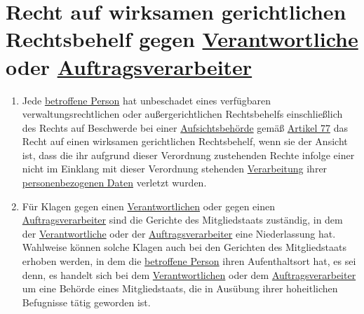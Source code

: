 \chapter{Recht auf wirksamen gerichtlichen Rechtsbehelf gegen \hyperref[itm:04-7]{Verantwortliche} oder \hyperref[itm:04-8]{Auftragsverarbeiter}}
\label{ch:79}


\begin{enumerate}

  \item Jede \hyperref[itm:04-1]{betroffene Person} hat unbeschadet eines verfügbaren verwaltungsrechtlichen oder außergerichtlichen
   Rechtsbehelfs einschließlich des Rechts auf Beschwerde bei einer \hyperref[itm:04-21]{Aufsichtsbehörde} gemäß \hyperref[ch:77]{Artikel 77}
   das Recht auf einen wirksamen gerichtlichen Rechtsbehelf, wenn sie der Ansicht ist, dass die ihr aufgrund dieser
   Verordnung zustehenden Rechte infolge einer nicht im Einklang mit dieser Verordnung stehenden \hyperref[itm:04-2]{Verarbeitung} ihrer
   \hyperref[itm:04-1]{personenbezogenen Daten} verletzt wurden.
  \label{itm:79-1}

  \item Für Klagen gegen einen \hyperref[itm:04-7]{Verantwortlichen} oder gegen einen \hyperref[itm:04-8]{Auftragsverarbeiter} sind die Gerichte des
   Mitgliedstaats zuständig, in dem der \hyperref[itm:04-7]{Verantwortliche} oder der \hyperref[itm:04-8]{Auftragsverarbeiter} eine Niederlassung hat. Wahlweise
   können solche Klagen auch bei den Gerichten des Mitgliedstaats erhoben werden, in dem die \hyperref[itm:04-1]{betroffene Person} ihren
   Aufenthaltsort hat, es sei denn, es handelt sich bei dem \hyperref[itm:04-7]{Verantwortlichen} oder dem \hyperref[itm:04-8]{Auftragsverarbeiter} um eine
   Behörde eines Mitgliedstaats, die in Ausübung ihrer hoheitlichen Befugnisse tätig geworden ist.
  \label{itm:79-2}

\end{enumerate}



